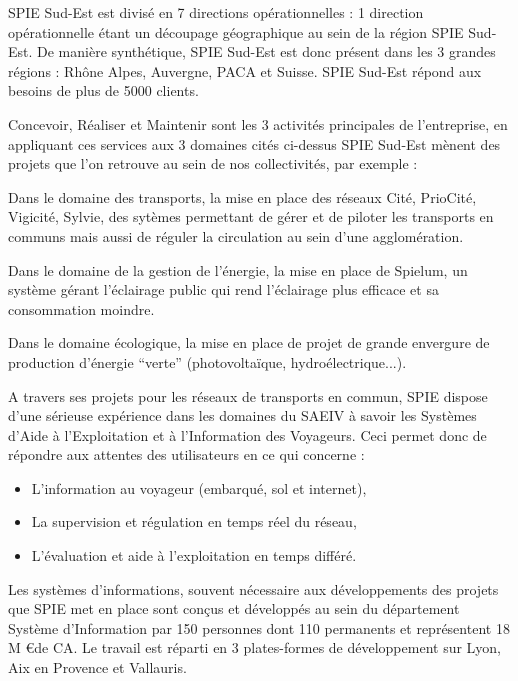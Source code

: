 SPIE Sud-Est est divisé en 7 directions opérationnelles : 1 direction opérationnelle étant un découpage géographique au sein de la région SPIE Sud-Est. De manière synthétique, SPIE Sud-Est est donc présent dans les 3 grandes régions : Rhône Alpes, Auvergne, PACA et  Suisse. SPIE Sud-Est répond aux besoins de plus de 5000 clients.


Concevoir, Réaliser et Maintenir sont les 3 activités principales de l’entreprise, en appliquant ces services aux 3 domaines cités ci-dessus SPIE Sud-Est mènent des projets que l’on retrouve au sein de nos collectivités, par exemple :

Dans le domaine des transports, la mise en place des réseaux Cité, PrioCité, Vigicité, Sylvie,  des sytèmes permettant de gérer et de piloter les transports en communs mais aussi de réguler la circulation au sein d’une agglomération.

Dans le domaine de la gestion de l’énergie, la mise en place de Spielum, un système gérant l’éclairage public qui rend l’éclairage plus efficace et sa consommation moindre.

Dans le domaine écologique, la mise en place de projet de grande envergure de production d’énergie “verte” (photovoltaïque, hydroélectrique...).

A travers ses projets pour les réseaux de transports en commun, SPIE dispose d’une sérieuse expérience dans les domaines du SAEIV à savoir les Systèmes d’Aide à l’Exploitation et à l’Information des Voyageurs. Ceci permet donc de répondre aux attentes des utilisateurs en ce qui concerne :

\begin{itemize}
\item L’information au voyageur (embarqué, sol et internet),
\item La supervision et régulation en temps réel du réseau,
\item L’évaluation et aide à l’exploitation en temps différé.
\end{itemize}

Les systèmes d’informations, souvent nécessaire aux développements des projets que SPIE met en place sont conçus et développés au sein du département Système d’Information par 150 personnes dont 110 permanents et représentent 18 M \euro de CA. Le travail est réparti en 3 plates-formes de développement sur Lyon, Aix en Provence et Vallauris.

